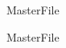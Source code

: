 \expandafter\ifx\csname MasterFile\endcsname\relax
\def\SubFile{hoge}


\fi
\begin{comment}
\cleardoublepage
\chapter[IJCAI-16投稿論文]{IJCAI-16\\投稿論文}
The 25th International Joint Conference on Artificial Intelligence (IJCAI-16)に投稿した論文を示す．

\begin{figure}
	\centering
	\texttt{[image: ../C.IJCAI-16/paper.pdf]}
\end{figure}

\begin{figure}
	\centering
	\texttt{[image: ../C.IJCAI-16/paper.pdf]}
\end{figure}

\begin{figure}
	\centering
	\texttt{[image: ../C.IJCAI-16/paper.pdf]}
\end{figure}

\begin{figure}
	\centering
	\texttt{[image: ../C.IJCAI-16/paper.pdf]}
\end{figure}

\begin{figure}
	\centering
	\texttt{[image: ../C.IJCAI-16/paper.pdf]}
\end{figure}

\begin{figure}
	\centering
	\texttt{[image: ../C.IJCAI-16/paper.pdf]}
\end{figure}


\clearpage
\end{comment}
\expandafter\ifx\csname MasterFile\endcsname\relax

\fi
